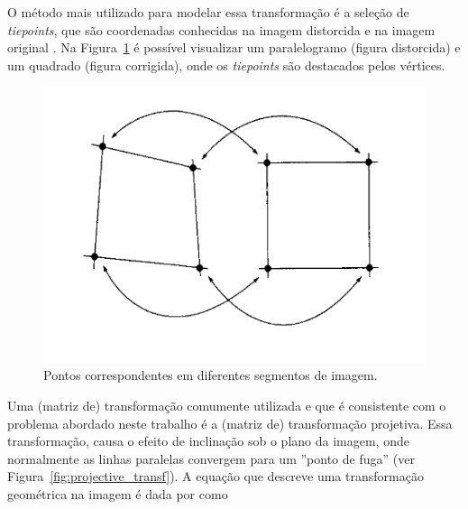 O método mais utilizado para modelar essa transformação é a seleção de \textit{tiepoints}, que são coordenadas conhecidas na imagem distorcida e na imagem original \cite{Gonzales:2000}. Na Figura~\ref{fig:spatial_transform_gonzales} é possível visualizar um paralelogramo (figura distorcida) e um quadrado (figura corrigida), onde os \textit{tiepoints} são destacados pelos vértices.

\begin{figure}[htb]
    \caption{Pontos correspondentes em diferentes segmentos de imagem.}
    \centering
    \begin{minipage}{.5\textwidth}
      \centering
         \includegraphics[width=1\linewidth]{TCC/Imagens/spatial_transform.png}
	\end{minipage}
    \label{fig:spatial_transform_gonzales}
\end{figure}


Uma (matriz de) transformação comumente utilizada e que é consistente com o problema abordado neste trabalho é a (matriz de) transformação projetiva. Essa transformação, causa o efeito de inclinação sob o plano da imagem, onde normalmente as linhas paralelas convergem para um ''ponto de fuga'' (ver Figura~\ref{fig:projective_transf}). A equação que descreve uma transformação geométrica na imagem é dada por \cite{Wolberg:1990} como

